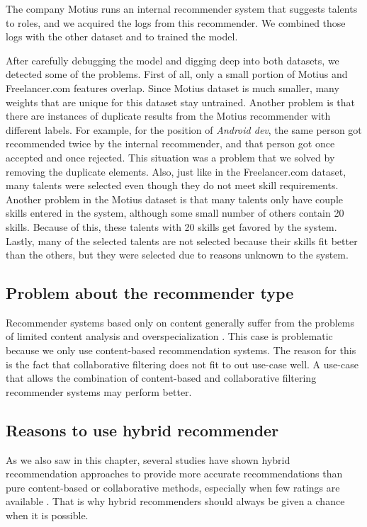 The company Motius runs an internal recommender system that suggests talents to roles, and we acquired the logs from this recommender. We combined those logs with the other dataset and to trained the model.

After carefully debugging the model and digging deep into both datasets, we detected some of the problems. First of all, only a small portion of Motius and Freelancer.com features overlap. Since Motius dataset is much smaller, many weights that are unique for this dataset stay untrained. Another problem is that there are instances of duplicate results from the Motius recommender with different labels. For example, for the position of \textit{Android dev}, the same person got recommended twice by the internal recommender, and that person got once accepted and once rejected. This situation was a problem that we solved by removing the duplicate elements. Also, just like in the Freelancer.com dataset, many talents were selected even though they do not meet skill requirements. Another problem in the Motius dataset is that many talents only have couple skills entered in the system, although some small number of others contain 20 skills. Because of this, these talents with 20 skills get favored by the system. Lastly,  many of the selected talents are not selected because their skills fit better than the others, but they were selected due to reasons unknown to the system.

\subsection{Problem about the recommender type}

Recommender systems based only on content generally suffer from the problems of limited content analysis and overspecialization \cite{shardanand1995social}. This case is problematic because we only use content-based recommendation systems. The reason for this is the fact that collaborative filtering does not fit to out use-case well. A use-case that allows the combination of content-based and collaborative filtering recommender systems may perform better.

\subsection{Reasons to use hybrid recommender}

As we also saw in this chapter, several studies have shown hybrid recommendation approaches to provide more accurate recommendations than pure content-based or collaborative methods, especially when few ratings are available \cite{adomavicius2005toward}. That is why hybrid recommenders should always be given a chance when it is possible.


